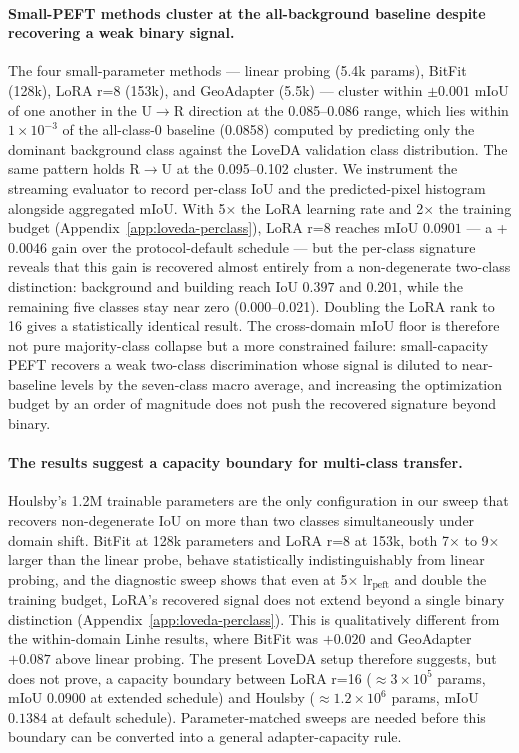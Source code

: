 \paragraph{Small-PEFT methods cluster at the all-background baseline despite recovering a weak binary signal.} The four small-parameter methods --- linear probing (5.4k params), BitFit (128k), LoRA r=8 (153k), and GeoAdapter (5.5k) --- cluster within $\pm 0.001$ mIoU of one another in the U$\rightarrow$R direction at the 0.085--0.086 range, which lies within $1 \times 10^{-3}$ of the all-class-0 baseline (0.0858) computed by predicting only the dominant background class against the LoveDA validation class distribution. The same pattern holds R$\rightarrow$U at the 0.095--0.102 cluster. We instrument the streaming evaluator to record per-class IoU and the predicted-pixel histogram alongside aggregated mIoU. With 5$\times$ the LoRA learning rate and 2$\times$ the training budget (Appendix~\ref{app:loveda-perclass}), LoRA r=8 reaches mIoU $0.0901$ --- a +$0.0046$ gain over the protocol-default schedule --- but the per-class signature reveals that this gain is recovered almost entirely from a non-degenerate two-class distinction: background and building reach IoU $0.397$ and $0.201$, while the remaining five classes stay near zero (0.000--0.021). Doubling the LoRA rank to 16 gives a statistically identical result. The cross-domain mIoU floor is therefore not pure majority-class collapse but a more constrained failure: small-capacity PEFT recovers a weak two-class discrimination whose signal is diluted to near-baseline levels by the seven-class macro average, and increasing the optimization budget by an order of magnitude does not push the recovered signature beyond binary.

\paragraph{The results suggest a capacity boundary for multi-class transfer.} Houlsby's 1.2M trainable parameters are the only configuration in our sweep that recovers non-degenerate IoU on more than two classes simultaneously under domain shift. BitFit at 128k parameters and LoRA r=8 at 153k, both 7$\times$ to 9$\times$ larger than the linear probe, behave statistically indistinguishably from linear probing, and the diagnostic sweep shows that even at 5$\times$ lr$_{\mathrm{peft}}$ and double the training budget, LoRA's recovered signal does not extend beyond a single binary distinction (Appendix~\ref{app:loveda-perclass}). This is qualitatively different from the within-domain Linhe results, where BitFit was $+0.020$ and GeoAdapter $+0.087$ above linear probing. The present LoveDA setup therefore suggests, but does not prove, a capacity boundary between LoRA r=16 ($\approx$$3 \times 10^5$ params, mIoU $0.0900$ at extended schedule) and Houlsby ($\approx$$1.2 \times 10^6$ params, mIoU $0.1384$ at default schedule). Parameter-matched sweeps are needed before this boundary can be converted into a general adapter-capacity rule.

